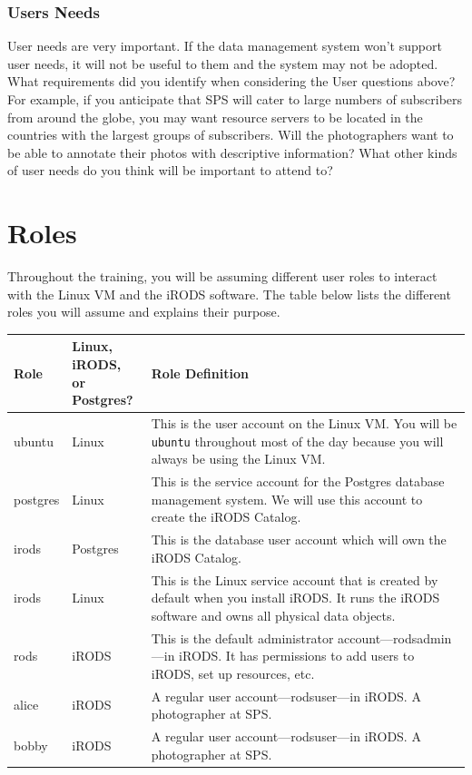 \documentclass[10pt,oneside]{memoir}
\begin{document}
\subsection{Users Needs}

User needs are very important. If the data management system won't support user needs, it will not be useful to them and the system may not be adopted. What requirements did you identify when considering the User questions above? For example, if you anticipate that SPS will cater to large numbers of subscribers from around the globe, you may want resource servers to be located in the countries with the largest groups of subscribers. Will the photographers want to be able to annotate their photos with descriptive information? What other kinds of user needs do you think will be important to attend to?

\chapter{Roles}

Throughout the training, you will be assuming different user roles to interact with the Linux VM and the iRODS software. The table below lists the different roles you will assume and explains their purpose.

\begin{center}
\def\arraystretch{1.7}%
\begin{tabular}{ |l|l|p{11cm}| }
\hline
Role & \makecell[c]{Linux, \\ iRODS, \\ or Postgres?} & Role Definition \\
\hline
ubuntu & Linux & This is the user account on the Linux VM. You will be \texttt{ubuntu} throughout most of the day because you will always be using the Linux VM. \\
postgres & Linux & This is the service account for the Postgres database management system. We will use this account to create the iRODS Catalog. \\
irods & Postgres & This is the database user account which will own the iRODS Catalog. \\
irods & Linux & This is the Linux service account that is created by default when you install iRODS. It runs the iRODS software and owns all physical data objects. \\
rods & iRODS & This is the default administrator account---rodsadmin---in iRODS. It has permissions to add users to iRODS, set up resources, etc. \\
alice & iRODS & A regular user account---rodsuser---in iRODS. A photographer at SPS. \\
bobby & iRODS & A regular user account---rodsuser---in iRODS. A photographer at SPS. \\
\hline
\end{tabular}
\end{center}
\end{document}
